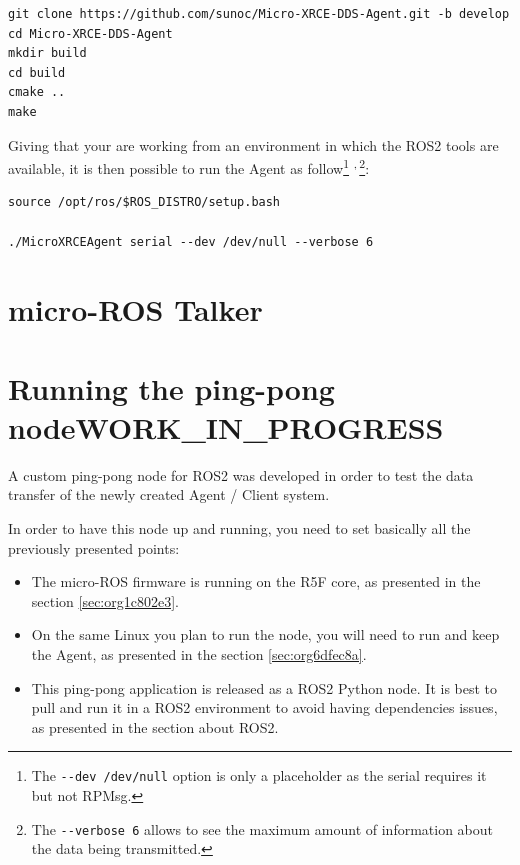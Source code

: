 \documentclass[10pt]{article}
\begin{document}
\begin{verbatim}
git clone https://github.com/sunoc/Micro-XRCE-DDS-Agent.git -b develop
cd Micro-XRCE-DDS-Agent
mkdir build
cd build
cmake ..
make
\end{verbatim}

Giving that your are working from an environment in which the ROS2 tools are available, it is then possible
to run the Agent as follow\footnote{The \texttt{-{}-{}dev /dev/null} option is only a placeholder as the serial requires it but not RPMsg.} \textsuperscript{,}\,\footnote{The \texttt{-{}-{}verbose 6} allows to see the maximum amount of information about the data being transmitted.}:

\begin{verbatim}
source /opt/ros/$ROS_DISTRO/setup.bash

./MicroXRCEAgent serial --dev /dev/null --verbose 6
\end{verbatim}


\clearpage
\section{micro-ROS Talker}
\label{sec:orgb176830}

\clearpage
\section{Running the ping-pong node\hfill{}\textsc{WORK\_IN\_PROGRESS}}
\label{sec:org2ce86a2}
A custom ping-pong node for ROS2 was developed in order to test the data transfer of the newly created
Agent / Client system.

In order to have this node up and running, you need to set basically all the previously presented points:
\begin{itemize}
\item The micro-ROS firmware is running on the R5F core, as presented in the section \ref{sec:org1c802e3}.
\item On the same Linux you plan to run the node, you will need to run and keep the Agent, as presented
in the section \ref{sec:org6dfec8a}.
\item This ping-pong application is released as a ROS2 Python node. It is best to pull and run it
in a ROS2 environment to avoid having dependencies issues, as presented in the section about ROS2.

\clearpage
\end{itemize}
\end{document}
